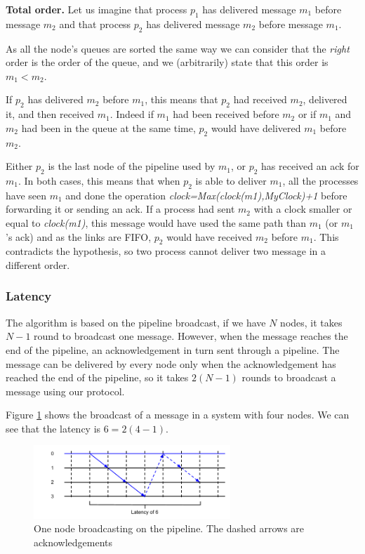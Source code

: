\documentclass[a4paper]{article}
\begin{document}
\bigskip
\noindent\textbf{Total order.} Let us imagine that process $p_1$ has delivered
message $m_1$ before message $m_2$ and that process $p_2$ has delivered
message $m_2$ before message $m_1$.

As all the node's queues are sorted the same way we can consider that the
\textit{right} order is the order of the queue, and we (arbitrarily) state
that this order is $m_1 < m_2$.

If $p_2$ has delivered $m_2$ before $m_1$, this means that $p_2$ had received
$m_2$, delivered it, and then received $m_1$. Indeed if $m_1$ had been
received before $m_2$ or if $m_1$ and $m_2$ had been in the queue at the
same time, $p_2$ would have delivered $m_1$ before $m_2$.

Either $p_2$ is the last node of the pipeline used by $m_1$, or $p_2$ has
received an ack for $m_1$. In both cases, this means that when $p_2$ is able
to deliver $m_1$, all the processes have seen $m_1$ and done the operation 
\textit{clock=Max(clock(m1),MyClock)+1} before forwarding it or sending an
ack. If a process had sent $m_2$ with a clock smaller or equal to
\textit{clock(m1)}, this message would have used the same path than $m_1$
(or $m_1$'s ack) and as the links are FIFO, $p_2$ would have received $m_2$
before $m_1$. This contradicts the hypothesis, so two process cannot deliver
two message in a different order.

\subsubsection{Latency}
The algorithm is based on the pipeline broadcast, if we have $N$ nodes, it
takes $N-1$ round to broadcast one message. However, when the message reaches
the end of the pipeline, an acknowledgement in turn sent through a pipeline.
The message can be delivered by every node only when the acknowledgement has
reached the end of the pipeline, so it takes $2(N-1)$ rounds to broadcast a
message using our protocol.

Figure \ref{figure:latency2} shows the broadcast of a message in a system with
four nodes. We can see that the latency is $6=2(4-1)$.

\begin{figure}[h]
    \centering
    \includegraphics[width=280px]{Latency2.png}
    \caption{One node broadcasting on the pipeline. The dashed arrows are
    acknowledgements}
    \label{figure:latency2}
\end{figure}
\end{document}
